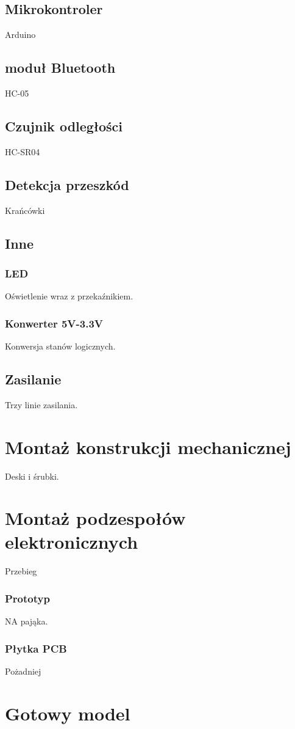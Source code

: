 \documentclass[../main/main.tex]{subfiles}
\begin{document}
\subsection{Mikrokontroler}
Arduino

\subsection{moduł Bluetooth}
HC-05

\subsection{Czujnik odległości}
HC-SR04

\subsection{Detekcja przeszkód}
Krańcówki

\subsection{Inne}
\subsubsection{LED}
Oświetlenie wraz z przekaźnikiem.

\subsubsection{Konwerter 5V-3.3V}
Konwersja stanów logicznych.

\subsection{Zasilanie}
Trzy linie zasilania.

\section{Montaż konstrukcji mechanicznej}
Deski i śrubki.

\section{Montaż podzespołów elektronicznych}
Przebieg
\subsubsection{Prototyp}
NA pająka.
\subsubsection{Płytka PCB}
Pożadniej

\section{Gotowy model}
\end{document}
